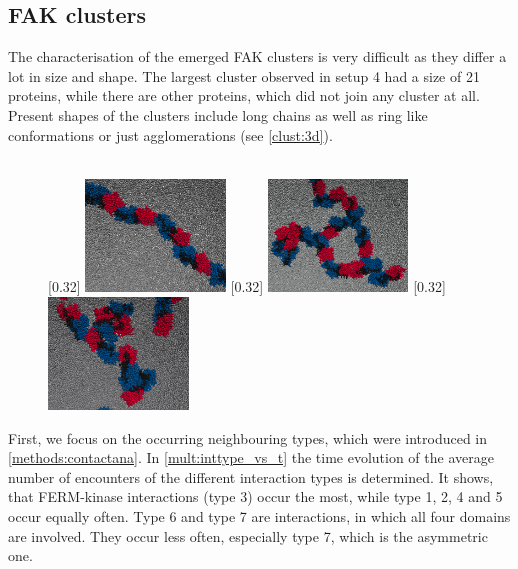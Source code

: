 \subsection{FAK clusters}
\label{mult:oligs}
The characterisation of the emerged FAK clusters is very difficult as they differ a lot in size and shape. The largest cluster observed in setup 4 had a size of 21 proteins, while there are other proteins, which did not join any cluster at all. Present shapes of the clusters include long chains as well as ring like conformations or just agglomerations (see \autoref{clust:3d}). \\
\\
%
%
%
\begin{figure}
	\subcaptionbox{\label{clust:3d_chain}}[0.32\textwidth]{
		\includegraphics[height=3cm]{figures/results/fak_chainlike}
	}\hfill%
	\subcaptionbox{\label{clust:3d_ring}}[0.32\textwidth]{
		\includegraphics[height=3cm]{figures/results/fak_circle}
	}\hfill%
	\subcaptionbox{\label{clust:3d_aggl}}[0.32\textwidth]{
		\includegraphics[height=3cm]{figures/results/fak_agglo}
	}
	\label{clust:3d}
\end{figure}
%
%
%
First, we focus on the occurring neighbouring types, which were introduced in \autoref{methods:contactana}. In \autoref{mult:inttype_vs_t} the time evolution of the average number of encounters of the different interaction types is determined. It shows, that FERM-kinase interactions (type 3) occur the most, while type 1, 2, 4 and 5 occur equally often. Type 6 and type 7 are interactions, in which all four domains are involved. They occur less often, especially type 7, which is the asymmetric one.\\
